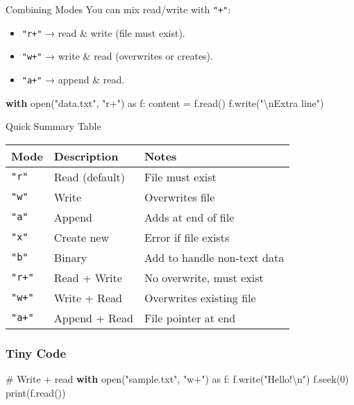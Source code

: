 \documentclass[
  letterpaper,
  DIV=11,
  numbers=noendperiod]{scrreprt}
\newenvironment{Shaded}{\begin{snugshade}}{\end{snugshade}}
\newcommand{\BuiltInTok}[1]{\textcolor[rgb]{0.00,0.23,0.31}{#1}}
\newcommand{\CharTok}[1]{\textcolor[rgb]{0.13,0.47,0.30}{#1}}
\newcommand{\CommentTok}[1]{\textcolor[rgb]{0.37,0.37,0.37}{#1}}
\newcommand{\ControlFlowTok}[1]{\textcolor[rgb]{0.00,0.23,0.31}{\textbf{#1}}}
\newcommand{\DecValTok}[1]{\textcolor[rgb]{0.68,0.00,0.00}{#1}}
\newcommand{\ImportTok}[1]{\textcolor[rgb]{0.00,0.46,0.62}{#1}}
\newcommand{\NormalTok}[1]{\textcolor[rgb]{0.00,0.23,0.31}{#1}}
\newcommand{\OperatorTok}[1]{\textcolor[rgb]{0.37,0.37,0.37}{#1}}
\newcommand{\StringTok}[1]{\textcolor[rgb]{0.13,0.47,0.30}{#1}}
\providecommand{\tightlist}{%
  \setlength{\itemsep}{0pt}\setlength{\parskip}{0pt}}
\begin{document}
Combining Modes You can mix read/write with \texttt{"+"}:

\begin{itemize}
\tightlist
\item
  \texttt{"r+"} → read \& write (file must exist).
\item
  \texttt{"w+"} → write \& read (overwrites or creates).
\item
  \texttt{"a+"} → append \& read.
\end{itemize}

\begin{Shaded}
\begin{Highlighting}[]
\ControlFlowTok{with} \BuiltInTok{open}\NormalTok{(}\StringTok{"data.txt"}\NormalTok{, }\StringTok{"r+"}\NormalTok{) }\ImportTok{as}\NormalTok{ f:}
\NormalTok{    content }\OperatorTok{=}\NormalTok{ f.read()}
\NormalTok{    f.write(}\StringTok{"}\CharTok{\textbackslash{}n}\StringTok{Extra line"}\NormalTok{)}
\end{Highlighting}
\end{Shaded}

Quick Summary Table

\begin{longtable}[]{@{}lll@{}}
\toprule\noalign{}
Mode & Description & Notes \\
\midrule\noalign{}
\endhead
\bottomrule\noalign{}
\endlastfoot
\texttt{"r"} & Read (default) & File must exist \\
\texttt{"w"} & Write & Overwrites file \\
\texttt{"a"} & Append & Adds at end of file \\
\texttt{"x"} & Create new & Error if file exists \\
\texttt{"b"} & Binary & Add to handle non-text data \\
\texttt{"r+"} & Read + Write & No overwrite, must exist \\
\texttt{"w+"} & Write + Read & Overwrites existing file \\
\texttt{"a+"} & Append + Read & File pointer at end \\
\end{longtable}

\subsubsection{Tiny Code}\label{tiny-code-53}

\begin{Shaded}
\begin{Highlighting}[]
\CommentTok{\# Write + read}
\ControlFlowTok{with} \BuiltInTok{open}\NormalTok{(}\StringTok{"sample.txt"}\NormalTok{, }\StringTok{"w+"}\NormalTok{) }\ImportTok{as}\NormalTok{ f:}
\NormalTok{    f.write(}\StringTok{"Hello!}\CharTok{\textbackslash{}n}\StringTok{"}\NormalTok{)}
\NormalTok{    f.seek(}\DecValTok{0}\NormalTok{)}
    \BuiltInTok{print}\NormalTok{(f.read())}
\end{Highlighting}
\end{Shaded}
\end{document}
